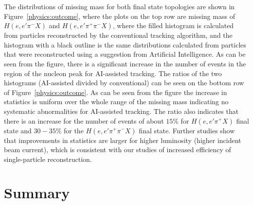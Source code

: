 \documentclass[aps,prl,preprint,12pt]{revtex4}
\begin{document}
The distributions of missing mass for both final state topologies are shown in Figure~\ref{physics:outcome}, where the plots 
on the top row are missing mass of $H(e,e'\pi^-X)$ and $H(e,e'\pi^+\pi^-X)$, where the filled histogram is calculated from 
particles reconstructed by the conventional tracking algorithm, and the histogram with a black outline is the same distributions 
calculated from particles that were reconstructed using a suggestion from Artificial Intelligence. As can be seen from the figure, 
there is a significant increase in the number of events in the region of the nucleon peak for AI-assisted
tracking. The ratios of the two histograms (AI-assisted divided by conventional) can be seen on the bottom row of 
Figure~\ref{physics:outcome}. As can be seen from the figure the increase in statistics is uniform over the whole range of the 
missing mass indicating no systematic abnormalities for AI-assisted tracking. The ratio also indicates that there is an increase 
for the number of events of about $15\%$ for $H(e,e'\pi^+X)$ final state and $30-35\%$ for the $H(e,e'\pi^+\pi^-X)$
final state. Further studies show that improvements in statistics are larger for higher luminosity (higher incident beam current), 
which is consistent with our studies of increased efficiency of single-particle reconstruction.

\section{Summary}
\end{document}

